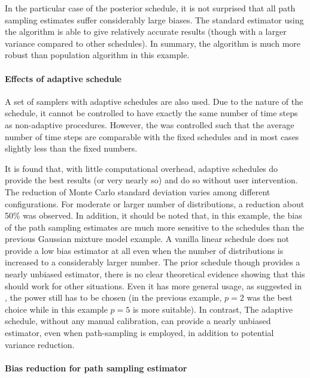 In the particular case of the posterior schedule, it is not surprised that all path sampling estimates suffer considerably large biases. The standard estimator using the \smc[2] algorithm is able to give relatively accurate results (though with a larger variance compared to other schedules). In summary, the \smc algorithm is much more robust than population \mcmc algorithm in this example.

\afterpage{\clearpage}
\afterpage{\clearpage}

\paragraph{Effects of adaptive schedule}

A set of samplers with adaptive schedules are also used. Due to the nature of the schedule, it cannot be controlled to have exactly the same number of time steps as non-adaptive procedures. However, the \cess was controlled such that the average number of time steps are comparable with the fixed schedules and in most cases slightly less than the fixed numbers.

It is found that, with little computational overhead, adaptive schedules do provide the best results (or very nearly so) and do so without user intervention. The reduction of Monte Carlo standard deviation varies among different configurations. For moderate or larger number of distributions, a reduction about 50\% was observed. In addition, it should be noted that, in this example, the bias of the path sampling estimates are much more sensitive to the schedules than the previous Gaussian mixture model example. A vanilla linear schedule does not provide a low bias estimator at all even when the number of distributions is increased to a considerably larger number. The prior schedule though provides a nearly unbiased estimator, there is no clear theoretical evidence showing that this should work for other situations. Even it has more general usage, as suggested in \cite{Calderhead:2009bd}, the power still has to be chosen (in the previous \gmm example, $p = 2$ was the best choice while in this \pet example $p = 5$ is more suitable). In contrast, The adaptive schedule, without any manual calibration, can provide a nearly unbiased estimator, even when path-sampling is employed, in addition to potential variance reduction.

\paragraph{Bias reduction for path sampling estimator}

